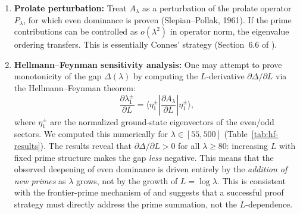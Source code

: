 \documentclass[12pt,a4paper]{article}
\theoremstyle{definition}
\theoremstyle{remark}
\begin{document}
\begin{enumerate}[label=(\Alph*)]
  This absence has structural meaning: the matrices $D_N(r)$ at different $r$ have fundamentally different eigenbases, and no fixed basis diagonalizes them simultaneously. The prime shifts at different scales carry no common hidden symmetry. This is consistent with the multiplicative independence of primes: they have no joint algebraic structure that a single operator could capture. Even dominance therefore cannot arise from a Sturm--Liouville-type oscillation principle. It must come from the pointwise Shift Parity Lemma summed with prime weights---exactly the frontier-dominance mechanism.

  \item \textbf{Prolate perturbation:} Treat $A_\lambda$ as a perturbation of the prolate operator $P_\lambda$, for which even dominance is proven (Slepian--Pollak, 1961). If the prime contributions can be controlled as $o(\lambda^2)$ in operator norm, the eigenvalue ordering transfers. This is essentially Connes' strategy (Section~6.6 of \cite{Connes2026}).

  \item \textbf{Hellmann--Feynman sensitivity analysis:} One may attempt to prove monotonicity of the gap $\Delta(\lambda)$ by computing the $L$-derivative $\partial\Delta/\partial L$ via the Hellmann--Feynman theorem:
  \[ \frac{\partial \lambda_1^\pm}{\partial L} = \langle \eta_1^\pm | \frac{\partial A_\lambda}{\partial L} | \eta_1^\pm \rangle, \]
  where $\eta_1^\pm$ are the normalized ground-state eigenvectors of the even/odd sectors.
  We computed this numerically for $\lambda \in [55, 500]$ (Table~\ref{tab:hf-results}). The results reveal that $\partial\Delta/\partial L > 0$ for all $\lambda \geq 80$: increasing $L$ with fixed prime structure makes the gap \emph{less} negative. This means that the observed deepening of even dominance is driven entirely by the \emph{addition of new primes} as $\lambda$ grows, not by the growth of $L = \log\lambda$. This is consistent with the frontier-prime mechanism of  and suggests that a successful proof strategy must directly address the prime summation, not the $L$-dependence.
\end{enumerate}
\end{document}
